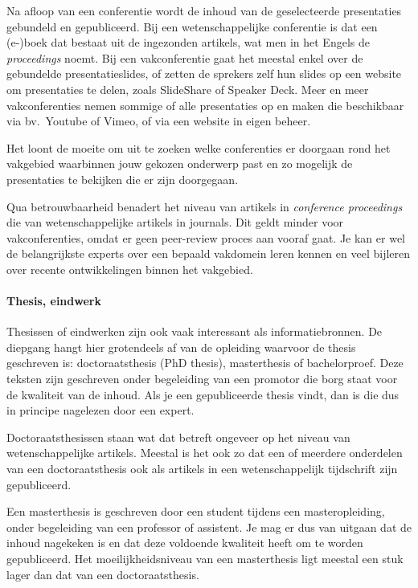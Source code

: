 Na afloop van een conferentie wordt de inhoud van de geselecteerde presentaties gebundeld en gepubliceerd. Bij een wetenschappelijke conferentie is dat een {(e-)boek} dat bestaat uit de ingezonden artikels, wat men in het Engels de \emph{proceedings} noemt. Bij een vakconferentie gaat het meestal enkel over de gebundelde presentatieslides, of zetten de sprekers zelf hun slides op een website om presentaties te delen, zoals SlideShare of Speaker Deck. Meer en meer vakconferenties nemen sommige of alle presentaties op en maken die beschikbaar via bv.~Youtube of Vimeo, of via een website in eigen beheer.

Het loont de moeite om uit te zoeken welke conferenties er doorgaan rond het vakgebied waarbinnen jouw gekozen onderwerp past en zo mogelijk de presentaties te bekijken die er zijn doorgegaan.

Qua betrouwbaarheid benadert het niveau van artikels in \emph{conference pro\-ceed\-ings} die van wetenschappelijke artikels in journals. Dit geldt minder voor vakconferenties, omdat er geen peer-review proces aan vooraf gaat. Je kan er wel de belangrijkste experts over een bepaald vakdomein leren kennen en veel bijleren over recente ontwikkelingen binnen het vakgebied.

\paragraph{Thesis, eindwerk}

Thesissen of eindwerken zijn ook vaak interessant als informatiebronnen. De diepgang hangt hier grotendeels af van de opleiding waarvoor de thesis geschreven is: doctoraatsthesis (PhD thesis), masterthesis of bachelorproef. Deze teksten zijn geschreven onder begeleiding van een promotor die borg staat voor de kwaliteit van de inhoud. Als je een gepubliceerde thesis vindt, dan is die dus in principe nagelezen door een expert.

Doctoraatsthesissen staan wat dat betreft ongeveer op het niveau van wetenschappelijke artikels. Meestal is het ook zo dat een of meerdere onderdelen van een doctoraatsthesis ook als artikels in een wetenschappelijk tijdschrift zijn gepubliceerd.

Een masterthesis is geschreven door een student tijdens een masteropleiding, onder begeleiding van een professor of assistent. Je mag er dus van uitgaan dat de inhoud nagekeken is en dat deze voldoende kwaliteit heeft om te worden gepubliceerd. Het moeilijkheidsniveau van een masterthesis ligt meestal een stuk lager dan dat van een doctoraatsthesis.

